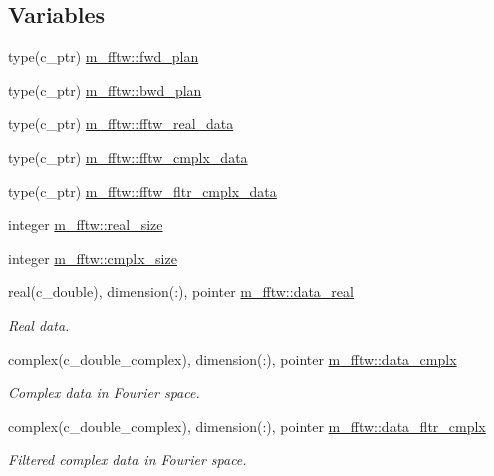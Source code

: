 \subsection*{Variables}
\begin{DoxyCompactItemize}
\item 
type(c\+\_\+ptr) \hyperlink{namespacem__fftw_af605e2137e55bfc3b5e95bbdad51803a}{m\+\_\+fftw\+::fwd\+\_\+plan}
\item 
type(c\+\_\+ptr) \hyperlink{namespacem__fftw_a5120d0924ad190de0c0967cfdfdffb64}{m\+\_\+fftw\+::bwd\+\_\+plan}
\item 
type(c\+\_\+ptr) \hyperlink{namespacem__fftw_a0db6f31d6d28b16d18982654bd98501a}{m\+\_\+fftw\+::fftw\+\_\+real\+\_\+data}
\item 
type(c\+\_\+ptr) \hyperlink{namespacem__fftw_a5ec1a65aeb900c5fc0c437c04a15bb1c}{m\+\_\+fftw\+::fftw\+\_\+cmplx\+\_\+data}
\item 
type(c\+\_\+ptr) \hyperlink{namespacem__fftw_acf83109d9518ac141074223356bc9385}{m\+\_\+fftw\+::fftw\+\_\+fltr\+\_\+cmplx\+\_\+data}
\item 
integer \hyperlink{namespacem__fftw_a7963f79188a7191b7d8436707e2aa4a5}{m\+\_\+fftw\+::real\+\_\+size}
\item 
integer \hyperlink{namespacem__fftw_afa99ee82497ae0ee316e97734ad0d7d3}{m\+\_\+fftw\+::cmplx\+\_\+size}
\item 
real(c\+\_\+double), dimension(\+:), pointer \hyperlink{namespacem__fftw_a5fc31000de6fec8b2dc1a9a1259f8089}{m\+\_\+fftw\+::data\+\_\+real}
\begin{DoxyCompactList}\small\item\em Real data. \end{DoxyCompactList}\item 
complex(c\+\_\+double\+\_\+complex), dimension(\+:), pointer \hyperlink{namespacem__fftw_a46b5b6c6849f50f0fe5f96301520e981}{m\+\_\+fftw\+::data\+\_\+cmplx}
\begin{DoxyCompactList}\small\item\em Complex data in Fourier space. \end{DoxyCompactList}\item 
complex(c\+\_\+double\+\_\+complex), dimension(\+:), pointer \hyperlink{namespacem__fftw_a2baa49912c2585f5937bcb41804edc3a}{m\+\_\+fftw\+::data\+\_\+fltr\+\_\+cmplx}
\begin{DoxyCompactList}\small\item\em Filtered complex data in Fourier space. \end{DoxyCompactList}\end{DoxyCompactItemize}


